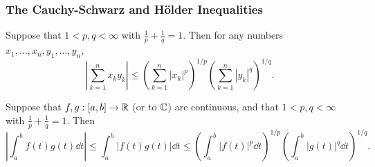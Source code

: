 \subsubsection{The Cauchy-Schwarz and H\"{o}lder Inequalities}

\begin{theorem}
    Suppose that \(1 < p, q < \infty\) with \(\frac{1}{p} + \frac{1}{q} = 1\). Then for any numbers \(x_1, \dots, x_n, y_1, \dots, y_n\),
    \[\left|\sum_{k=1}^{n} x_k y_k\right| \leq \left(\sum_{k=1}^{n}|x_k|^p\right)^{1/p} \left(\sum_{k=1}^{n} |y_k|^q\right)^{1/q}.\]
\end{theorem}

\begin{theorem}
    Suppose that \(f, g: [a, b] \to \mathbb{R}\) (or to \(\mathbb{C}\)) are continuous, and that \(1 < p, q < \infty\) with \(\frac{1}{p} + \frac{1}{q} = 1\). Then
    \[\left|\int_a^b f(t)g(t) \dd{t}\right| \leq \int_a^b |f(t)g(t)| \dd{t} \leq \left(\int_a^b |f(t)|^p \dd{t}\right)^{1/p} \left(\int_a^b |g(t)|^q \dd{t}\right)^{1/q}.\]
\end{theorem}

\pagebreak